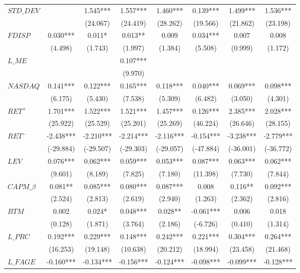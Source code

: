 \begin{xltabular}{\linewidth}{X * {7}{S[table-format=4.3]}}
\endfoot
\bottomrule
\endlastfoot
$STD\_DEV$ &  & 1.545*** & 1.557*** & 1.460*** & 0.139*** & 1.499*** & 1.536***\\
 &  & (24.067) & (24.419) & (28.262) & (19.566) & (21.862) & (23.198)\\
\addlinespace
$FDISP$ & 0.030*** & 0.011* & 0.013** & 0.009 & 0.034*** & 0.007 & 0.008\\
 & (4.498) & (1.743) & (1.997) & (1.384) & (5.508) & (0.999) & (1.172)\\
\addlinespace
$L\_ME$ &  &  & 0.107*** &  &  &  & \\
 &  &  & (9.970) &  &  &  & \\
\addlinespace
$NASDAQ$ & 0.141*** & 0.122*** & 0.165*** & 0.118*** & 0.040*** & 0.069*** & 0.098***\\
 & (6.175) & (5.430) & (7.538) & (5.309) & (6.482) & (3.050) & (4.301)\\
\addlinespace
$RET^+$ & 1.701*** & 1.522*** & 1.521*** & 1.457*** & 0.126*** & 2.385*** & 2.028***\\
 & (25.922) & (25.529) & (25.201) & (25.269) & (46.224) & (26.646) & (28.155)\\
\addlinespace
$RET^-$ & -2.438*** & -2.210*** & -2.214*** & -2.116*** & -0.154*** & -3.238*** & -2.779***\\
 & (-29.884) & (-29.507) & (-29.303) & (-29.057) & (-47.884) & (-36.001) & (-36.772)\\
\addlinespace
$LEV$ & 0.076*** & 0.062*** & 0.059*** & 0.053*** & 0.087*** & 0.063*** & 0.062***\\
 & (9.601) & (8.189) & (7.825) & (7.180) & (11.398) & (7.730) & (7.844)\\
\addlinespace
$CAPM\_\beta$ & 0.081** & 0.085*** & 0.080*** & 0.087*** & 0.008 & 0.116** & 0.092***\\
 & (2.524) & (2.813) & (2.619) & (2.940) & (1.263) & (2.362) & (2.816)\\
\addlinespace
$BTM$ & 0.002 & 0.024* & 0.048*** & 0.028** & -0.061*** & 0.006 & 0.018\\
 & (0.128) & (1.871) & (3.764) & (2.186) & (-6.726) & (0.410) & (1.314)\\
\addlinespace
$L\_PRC$ & 0.192*** & 0.229*** & 0.148*** & 0.242*** & 0.221*** & 0.304*** & 0.264***\\
 & (16.253) & (19.148) & (10.638) & (20.212) & (18.994) & (23.458) & (21.468)\\
\addlinespace
$L\_FAGE$ & -0.160*** & -0.134*** & -0.156*** & -0.124*** & -0.098*** & -0.099*** & -0.128***\\

\end{xltabular}
